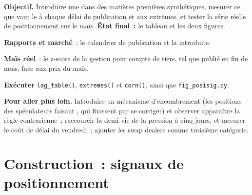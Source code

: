 \begin{tutorial}
\textbf{Objectif.} Introduire une  dans des matières premières synthétiques, mesurer ce que vaut le  à chaque délai de publication et aux extrêmes,
et tester la série réelle de positionnement sur le maïs. \textbf{État final~:} le tableau et les deux figures.
\begin{tutsteps}
\item \textbf{Rapports et marché}~: le calendrier de publication et la  introduite.
\label{lst:s1:positioning-and-sentiment:model}
\item \textbf{Maïs réel}~: le z-score de la gestion pour compte de tiers, tel que publié en fin de mois, face aux prix du maïs.
\label{lst:s1:positioning-and-sentiment:corn}
\item \textbf{Exécuter} \texttt{lag\_table()}, \texttt{extremes()} et \texttt{corn()}, ainsi que \texttt{fig\_posisig.py}.
\end{tutsteps}
\textbf{Pour aller plus loin.} Introduire un mécanisme d'encombrement (les positions des spéculateurs faisant , qui finissent par se corriger) et observer apparaître la règle contrarienne~;
raccourcir la demi-vie de la pression à cinq jours, et mesurer le coût de délai du vendredi~; ajouter les swap dealers comme troisième catégorie.
\end{tutorial}

\section{Construction~: signaux de positionnement}\label{bld:s1:positioning-and-sentiment:posisig}

